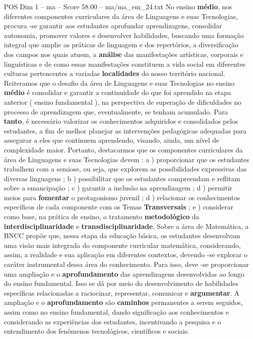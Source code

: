 \begin{textsample}{POS Dim 1 – ma – Score 58.00 – ma/ma\_em\_24.txt}
No ensino \textbf{médio}, nos diferentes componentes curriculares da área de Linguagens e suas Tecnologias, procura -se garantir aos estudantes aprofundar aprendizagens, consolidar autonomia, promover valores e desenvolver habilidades, buscando uma formação integral que amplie as práticas de linguagem e dos repertórios, a diversificação dos campos nos quais atuem, a \textbf{análise} das manifestações artísticas, corporais e linguísticas e de como essas manifestações constituem a vida social em diferentes culturas pertencentes a variadas \textbf{localidades} do nosso território nacional.
Reiteramos que o desafio da área de Linguagens e suas Tecnologias no ensino \textbf{médio} é consolidar e garantir a continuidade do que foi aprendido na etapa anterior ( ensino fundamental ), na perspectiva de superação de dificuldades no processo de aprendizagem que, eventualmente, se tenham acumulado.
Para \textbf{tanto}, é necessário valorizar os conhecimentos adquiridos e consolidados pelos estudantes, a fim de melhor planejar as intervenções pedagógicas adequadas para assegurar a eles que continuem aprendendo, visando, ainda, um nível de complexidade maior.
Portanto, destacarmos que os componentes curriculares da área de Linguagens e suas Tecnologias devem : a ) proporcionar que os estudantes trabalhem com a semiose, ou seja, que explorem as possibilidades expressivas das diversas linguagens ; b ) possibilitar que os estudantes compreendam e reflitam sobre a emancipação ; c ) garantir a inclusão na aprendizagem ; d ) permitir meios para \textbf{fomentar} o protagonismo juvenil ; d ) relacionar os conhecimentos específicos de cada componente com os Temas \textbf{Transversais} ; e ) considerar como base, na prática de ensino, o tratamento \textbf{metodológico} da \textbf{interdisciplinaridade} e \textbf{transdisciplinaridade}.
Sobre a área de Matemática, a BNCC propõe que, nessa etapa da educação básica, os estudantes desenvolvam uma visão mais integrada do componente curricular matemática, considerando, assim, a realidade e sua aplicação em diferentes contextos, devendo -se explorar o caráter instrumental dessa área do conhecimento.
Para isso, deve -se proporcionar uma ampliação e o \textbf{aprofundamento} das aprendizagens desenvolvidas ao longo do ensino fundamental.
Isso se dá por meio do desenvolvimento de habilidades específicas relacionadas a raciocinar, representar, comunicar e \textbf{argumentar}.
A ampliação e o \textbf{aprofundamento} são \textbf{caminhos} permanentes a serem seguidos, assim como no ensino fundamental, dando significação aos conhecimentos e considerando as experiências dos estudantes, incentivando a pesquisa e o entendimento dos fenômenos tecnológicos, científicos e sociais.

\end{textsample}
